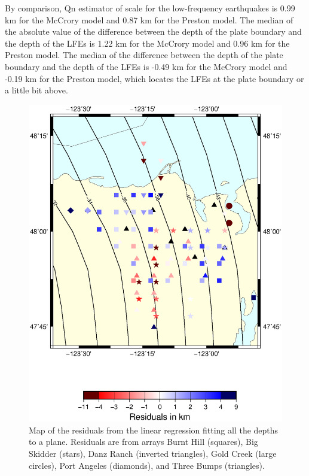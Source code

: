 \documentclass[draft]{agujournal2019}
\begin{document}
By comparison, Qn estimator of scale for the low-frequency earthquakes is 0.99 km for the McCrory model and 0.87 km for the Preston model. The median of the absolute value of the difference between the depth of the plate boundary and the depth of the LFEs is 1.22 km for the McCrory model and 0.96 km for the Preston model. The median of the difference between the depth of the plate boundary and the depth of the LFEs is -0.49 km for the McCrory model and -0.19 km for the Preston model, which locates the LFEs at the plate boundary or a little bit above.


\begin{figure}
\noindent\includegraphics[width=\textwidth, trim={1cm 5cm 3.5cm 4cm},clip]{figures/error_PWS_PWS.eps}
\caption{Map of the residuals from the linear regression fitting all the depths to a plane. Residuals are from arrays Burnt Hill (squares), Big Skidder (stars), Danz Ranch (inverted triangles),  Gold Creek (large circles), Port Angeles (diamonds), and Three Bumps (triangles).}
\label{pngfiguresample}
\end{figure}
\end{document}
